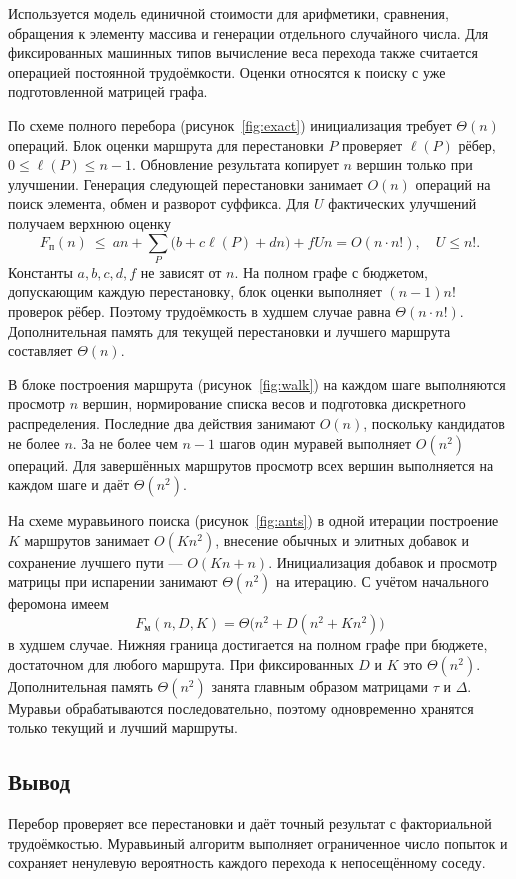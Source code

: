 Используется модель единичной стоимости для арифметики, сравнения, обращения к элементу массива и генерации отдельного случайного числа. Для фиксированных машинных типов вычисление веса перехода также считается операцией постоянной трудоёмкости. Оценки относятся к поиску с уже подготовленной матрицей графа.

По схеме полного перебора (рисунок~\ref{fig:exact}) инициализация требует $\Theta(n)$ операций. Блок оценки маршрута для перестановки $P$ проверяет $\ell(P)$ рёбер, $0\le\ell(P)\le n-1$. Обновление результата копирует $n$ вершин только при улучшении. Генерация следующей перестановки занимает $O(n)$ операций на поиск элемента, обмен и разворот суффикса. Для $U$ фактических улучшений получаем верхнюю оценку
\begin{equation}
F_{\text{п}}(n)\ \leq\ a n + \sum_{P}\bigl(b+c\ell(P)+dn\bigr)+fUn
 = O(n\cdot n!),\quad U\le n!.
\end{equation}
Константы $a,b,c,d,f$ не зависят от $n$. На полном графе с бюджетом, допускающим каждую перестановку, блок оценки выполняет $(n-1)n!$ проверок рёбер. Поэтому трудоёмкость в худшем случае равна $\Theta(n\cdot n!)$. Дополнительная память для текущей перестановки и лучшего маршрута составляет $\Theta(n)$.

В блоке построения маршрута (рисунок~\ref{fig:walk}) на каждом шаге выполняются просмотр $n$ вершин, нормирование списка весов и подготовка дискретного распределения. Последние два действия занимают $O(n)$, поскольку кандидатов не более $n$. За не более чем $n-1$ шагов один муравей выполняет $O(n^2)$ операций. Для завершённых маршрутов просмотр всех вершин выполняется на каждом шаге и даёт $\Theta(n^2)$.

На схеме муравьиного поиска (рисунок~\ref{fig:ants}) в одной итерации построение $K$ маршрутов занимает $O(Kn^2)$, внесение обычных и элитных добавок и сохранение лучшего пути --- $O(Kn+n)$. Инициализация добавок и просмотр матрицы при испарении занимают $\Theta(n^2)$ на итерацию. С учётом начального феромона имеем
\begin{equation}
F_{\text{м}}(n,D,K)=\Theta\!\bigl(n^2+D(n^2+Kn^2)\bigr)
\end{equation}
в худшем случае. Нижняя граница достигается на полном графе при бюджете, достаточном для любого маршрута. При фиксированных $D$ и $K$ это $\Theta(n^2)$. Дополнительная память $\Theta(n^2)$ занята главным образом матрицами $\tau$ и $\Delta$. Муравьи обрабатываются последовательно, поэтому одновременно хранятся только текущий и лучший маршруты.

\subsection*{Вывод}

Перебор проверяет все перестановки и даёт точный результат с факториальной трудоёмкостью. Муравьиный алгоритм выполняет ограниченное число попыток и сохраняет ненулевую вероятность каждого перехода к непосещённому соседу.
